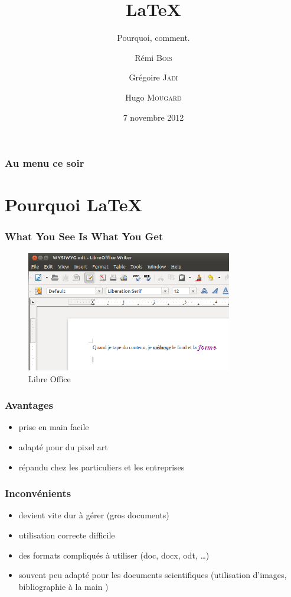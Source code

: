 \documentclass{beamer}
\title[Introduction à \LaTeX]{\LaTeX}
\subtitle{Pourquoi, comment.}
\institute{ASCII}
\date{7 novembre 2012}
\author[ASCII]{Rémi \textsc{Bois}
  \and Grégoire \textsc{Jadi}
  \and Hugo \textsc{Mougard}}
\begin{document}
\begin{frame}
  \maketitle  
\end{frame}

\begin{frame}
  \frametitle{Au menu ce soir}
  \tableofcontents
\end{frame}

\section{Pourquoi \LaTeX}

\begin{frame}
  \frametitle{What You See Is What You Get}
  \begin{figure}[H]
    \centering
    \includegraphics[width=9cm]{WYSIWYG}
    \caption{Libre Office}
    \label{fig:libre-office}
  \end{figure}
\end{frame}

\begin{frame}
  \frametitle{Avantages}
  \begin{itemize}
  \item prise en main facile
  \item adapté pour du \og pixel art \fg
  \item répandu chez les particuliers et les entreprises
  \end{itemize}
\end{frame}

\begin{frame}
  \frametitle{Inconvénients}
  \begin{itemize}
  \item devient vite dur à gérer (gros documents)
  \item utilisation correcte difficile
  \item des formats compliqués à utiliser (doc, docx, odt, \dots)
  \item souvent peu adapté pour les documents scientifiques
    (utilisation d'images, bibliographie \og à la main \fg)
  \end{itemize}
\end{frame}
\end{document}
